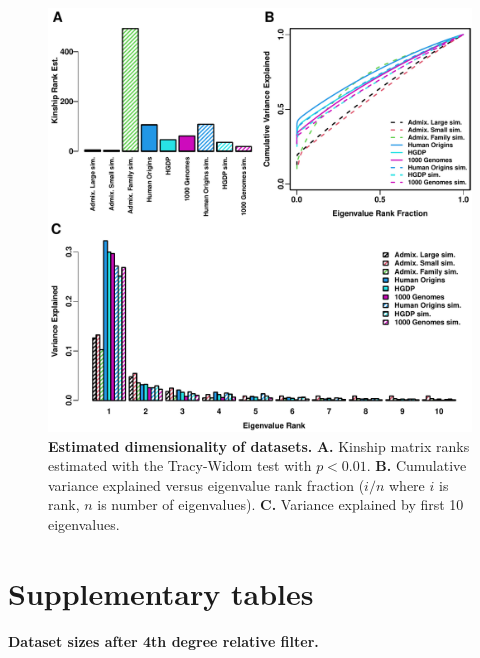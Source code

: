 \documentclass[11pt]{article}
\begin{document}
\begin{figure}[bp!]
  \centering
  \includegraphics[width=\textwidth]{eigen.pdf}
  \caption{
    {\bf Estimated dimensionality of datasets.}
    \textbf{A.}
    Kinship matrix ranks estimated with the Tracy-Widom test with $p < 0.01$.
    \textbf{B.}
    Cumulative variance explained versus eigenvalue rank fraction ($i/n$ where $i$ is rank, $n$ is number of eigenvalues).
    \textbf{C.}
    Variance explained by first 10 eigenvalues.
  }
  \label{fig:eigen}
\end{figure}

\clearpage

\section{Supplementary tables}

\begin{table}[hb!]
  \centering
  \footnotesize
  \caption{
    \textbf{Dataset sizes after 4th degree relative filter.}
  }
  \label{tab:king_cutoff}
\end{table}
\end{document}
